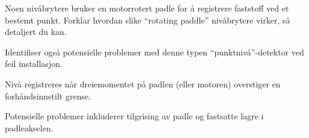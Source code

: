 

Noen nivåbrytere bruker en motorrotert padle for å registrere faststoff ved et bestemt punkt.  Forklar hvordan slike ``rotating paddle'' nivåbrytere virker, så detaljert du kan.

Identifiser også potensielle problemer med denne typen ``punktnivå''-detektor ved feil installasjon.







Nivå registreres når dreiemomentet på padlen (eller motoren) overstiger en forhåndsinnstilt grense.

\vskip 10pt

Potensielle problemer inkluderer tilgrising av padle og fastsatte lagre i padleakselen.









